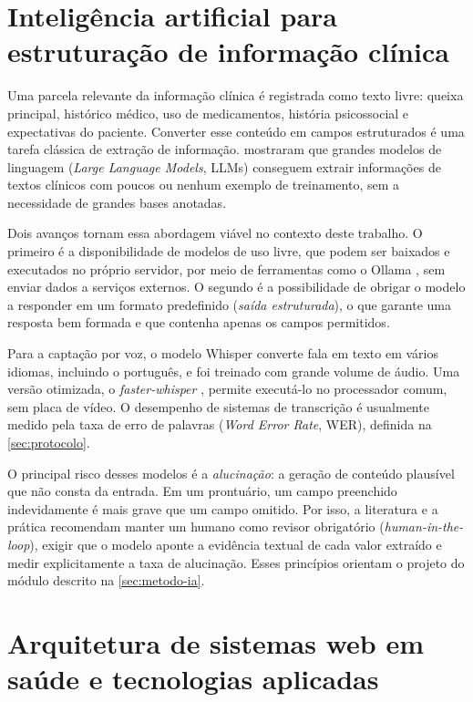 \section{Inteligência artificial para estruturação de informação clínica}
\label{sec:ia-estruturacao}

Uma parcela relevante da informação clínica é registrada como texto livre: queixa principal, histórico médico, uso de medicamentos, história psicossocial e expectativas do paciente. Converter esse conteúdo em campos estruturados é uma tarefa clássica de extração de informação.  mostraram que grandes modelos de linguagem (\textit{Large Language Models}, LLMs) conseguem extrair informações de textos clínicos com poucos ou nenhum exemplo de treinamento, sem a necessidade de grandes bases anotadas.

Dois avanços tornam essa abordagem viável no contexto deste trabalho. O primeiro é a disponibilidade de modelos de uso livre, que podem ser baixados e executados no próprio servidor, por meio de ferramentas como o Ollama \cite{ollama}, sem enviar dados a serviços externos. O segundo é a possibilidade de obrigar o modelo a responder em um formato predefinido (\emph{saída estruturada}), o que garante uma resposta bem formada e que contenha apenas os campos permitidos.

Para a captação por voz, o modelo Whisper \cite{radford2023} converte fala em texto em vários idiomas, incluindo o português, e foi treinado com grande volume de áudio. Uma versão otimizada, o \textit{faster-whisper} \cite{fasterwhisper}, permite executá-lo no processador comum, sem placa de vídeo. O desempenho de sistemas de transcrição é usualmente medido pela taxa de erro de palavras (\textit{Word Error Rate}, WER), definida na \autoref{sec:protocolo}.

O principal risco desses modelos é a \emph{alucinação}: a geração de conteúdo plausível que não consta da entrada. Em um prontuário, um campo preenchido indevidamente é mais grave que um campo omitido. Por isso, a literatura e a prática recomendam manter um humano como revisor obrigatório (\textit{human-in-the-loop}), exigir que o modelo aponte a evidência textual de cada valor extraído e medir explicitamente a taxa de alucinação. Esses princípios orientam o projeto do módulo descrito na \autoref{sec:metodo-ia}.

\section{Arquitetura de sistemas web em saúde e tecnologias aplicadas}
\label{sec:arquitetura-web}

